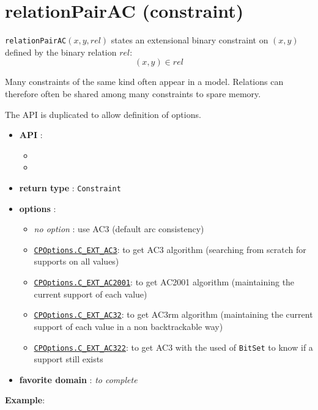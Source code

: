 \label{relationpairac}
\hypertarget{relationpairac}{}

\section{relationPairAC (constraint)}\label{relationpairac:relationpairacconstraint}\hypertarget{relationpairac:relationpairacconstraint}{}
\begin{notedef}
  \texttt{relationPairAC}$(x,y,rel)$ states an extensional binary constraint on $(x,y)$ defined by the binary relation $rel$:
$$(x,y)\in rel$$
\end{notedef}
Many constraints of the same kind often appear in a model. Relations can therefore often be shared among many constraints to spare memory.

The API is duplicated to allow definition of options.

\begin{itemize}
	\item \textbf{API} :
	\begin{itemize}
		\item {}
		\item {}
	\end{itemize}
	\item \textbf{return type} : \texttt{Constraint}
	\item \textbf{options} :
	\begin{itemize}
		\item \emph{no option} : use AC3 (default arc consistency)
		\item \hyperlink{cext3:cext3options}{\tt CPOptions.C\_EXT\_AC3}: to get AC3 algorithm (searching from scratch for supports on all values)
		\item \hyperlink{cext2001:cext2001options}{\tt CPOptions.C\_EXT\_AC2001}: to get AC2001 algorithm (maintaining the current support of each value)
		\item \hyperlink{cext32:cext32options}{\tt CPOptions.C\_EXT\_AC32}: to get AC3rm algorithm (maintaining the current support of each value in a non backtrackable way)
		\item \hyperlink{cext322:cext322options}{\tt CPOptions.C\_EXT\_AC322}: to get AC3 with the used of \texttt{BitSet} to know if a support still exists
	\end{itemize}
	\item \textbf{favorite domain} : \emph{to complete}
\end{itemize}

\textbf{Example}:



